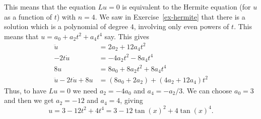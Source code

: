 \documentclass[a4paper]{amsart}
\begin{document}
\begin{solution}
\begin{itemize}
   This means that the equation $Lu=0$ is equivalent to the Hermite
   equation (for $u$ as a function of $t$) with $n=4$.  We saw in
   Exercise~\ref{ex-hermite} that there is a solution which is a
   polynomial of degree $4$, involving only even powers of $t$.  This
   means that $u=a_0+a_2t^2+a_4t^4$ say.  This gives
   \begin{align*}
    \ddot{u} &= 2a_2+12a_4t^2 \\
    -2t\dot{u} &= -4a_2t^2-8a_4t^4 \\
    8u &= 8a_0+8a_2t^2+8a_4t^4 \\
    \ddot{u}-2t\dot{u}+8u &= 
     (8a_0+2a_2) + (4a_2+12a_4)t^2
   \end{align*}
   Thus, to have $Lu=0$ we need $a_2=-4a_0$ and $a_4=-a_2/3$.  We can
   choose $a_0=3$ and then we get $a_2=-12$ and $a_4=4$, giving 
   \[ u = 3 -12 t^2 + 4t^4 = 
       3 - 12\tan(x)^2 + 4\tan(x)^4.
   \]
 \end{itemize}
\end{solution}
\end{document}
